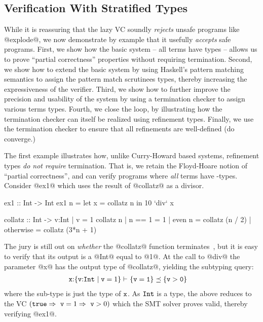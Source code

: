 \subsection{Verification With Stratified Types}\label{sec:overview:examples}
While it is reassuring that the lazy VC soundly \emph{rejects} 
unsafe programs like @explode@, we now demonstrate by example
that it usefully \emph{accepts} safe programs.
% 
First, we show how the basic system -- all terms
have \Div types -- allows us to prove ``partial correctness''
properties without requiring termination.
%
Second, we show how to extend the basic system by 
using Haskell's pattern matching semantics to assign 
the pattern match scrutinees \Wnf types, thereby 
increasing the expressiveness of the verifier.
%
Third, we show how to further improve the precision 
and usability of the system by using a termination 
checker to assign various terms \Fin types.
%
Fourth, we close the loop, by illustrating how the 
termination checker can itself be realized using 
refinement types.
%
Finally, we use the termination checker to ensure that
all refinements are well-defined (\ie do converge.) 

The first example illustrates how, unlike Curry-Howard based
systems, refinement types \emph{do not require} termination. 
%
That is, we retain the Floyd-Hoare notion of ``partial correctness'', 
and can verify programs where \emph{all} terms have \Div-types.
%
Consider @ex1@ which uses the result of @collatz@ as a divisor.
%
\begin{code}
  ex1   :: Int -> Int 
  ex1 n = let x = collatz n in 10 `div` x 

  collatz :: Int -> {v:Int | v = 1}
  collatz n 
    | n == 1    = 1 
    | even n    = collatz (n / 2)
    | otherwise = collatz (3*n + 1)
\end{code}
%
The jury is still out on \emph{whether} the @collatz@ 
function terminates~\cite{collatzWiki}, but it is easy
to verify that its output is a \Div @Int@ equal to @1@.
%
At the call to @div@ the parameter @x@ has the output type 
of @collatz@, yielding the subtyping query:
%
\begin{align*}
   {\ensuremath{\mathtt{x}}} \text{:} {\ensuremath{\{ {\mathtt{v}} \text{:} {\mathtt{Int}^{}} \mid \mathtt{v}=1 \}}} \vdash\ & \mathtt{\{v = 1\}} \preceq \mathtt{\{v > 0\}} 
\end{align*}
% 
where the sub-type is just the type of $\mathtt{x}$. 
As $\mathtt{Int}$ is a \Div type, the above reduces to the VC 
${(\mathtt{true} \Rightarrow\  \mathtt{v} = 1 \Rightarrow\ \mathtt{v} > 0)}$
which the SMT solver proves valid, thereby verifying @ex1@.

